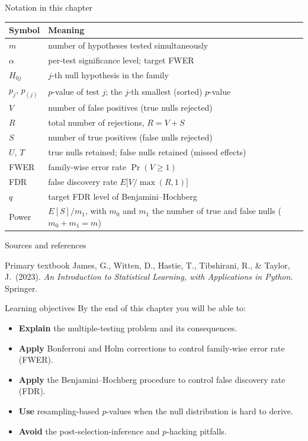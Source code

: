 \documentclass[aspectratio=169,11pt]{beamer}
\begin{document}
\begin{frame}{Notation in this chapter}
  \footnotesize
  \begin{center}
  \begin{tabular}{@{}ll@{}}
    \toprule
    \textbf{Symbol} & \textbf{Meaning} \\
    \midrule
    $m$ & number of hypotheses tested simultaneously \\
    $\alpha$ & per-test significance level; target FWER \\
    $H_{0j}$ & $j$-th null hypothesis in the family \\
    $p_j$, $p_{(j)}$ & $p$-value of test $j$; the $j$-th smallest (sorted) $p$-value \\
    $V$ & number of false positives (true nulls rejected) \\
    $R$ & total number of rejections, $R=V+S$ \\
    $S$ & number of true positives (false nulls rejected) \\
    $U$, $T$ & true nulls retained; false nulls retained (missed effects) \\
    FWER & family-wise error rate $\Pr(V\ge 1)$ \\
    FDR & false discovery rate $E\big[V/\max(R,1)\big]$ \\
    $q$ & target FDR level of Benjamini--Hochberg \\
    Power & $E[S]/m_1$, with $m_0$ and $m_1$ the number of true and false nulls ($m_0+m_1=m$) \\
    \bottomrule
  \end{tabular}
  \end{center}
\end{frame}

\begin{frame}{Sources and references}
  \begin{block}{Primary textbook}
    James, G., Witten, D., Hastie, T., Tibshirani, R., \& Taylor, J.\ (2023).
    \emph{An Introduction to Statistical Learning, with Applications in
    Python.} Springer.
  \end{block}
\end{frame}

\begin{frame}{Learning objectives}
  By the end of this chapter you will be able to:
  \begin{itemize}
    \item \textbf{Explain} the multiple-testing problem and its
          consequences.
    \item \textbf{Apply} Bonferroni and Holm corrections to control
          family-wise error rate (FWER).
    \item \textbf{Apply} the Benjamini--Hochberg procedure to control
          false discovery rate (FDR).
    \item \textbf{Use} resampling-based $p$-values when the null
          distribution is hard to derive.
    \item \textbf{Avoid} the post-selection-inference and
          $p$-hacking pitfalls.
  \end{itemize}
\end{frame}
\end{document}
